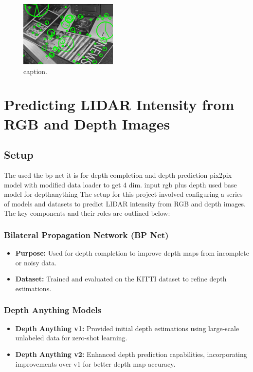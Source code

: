\begin{figure}[!ht]
	\centering
	\includegraphics[width=0.9\linewidth]{image.jpg}
	\caption{caption.}
	\label{img:example}
\end{figure}
\chapter{Predicting LIDAR Intensity from RGB and Depth Images}
\section{Setup}
The used the bp net it is for depth completion and depth prediction
pix2pix model with modified data loader to get 4 dim. input rgb plus depth
used base model for depthanything
The setup for this project involved configuring a series of models and datasets to predict LIDAR intensity from RGB and depth images. The key components and their roles are outlined below:

\subsection{Bilateral Propagation Network (BP Net)}
\begin{itemize}
	\item \textbf{Purpose:} Used for depth completion to improve depth maps from incomplete or noisy data.
	\item \textbf{Dataset:} Trained and evaluated on the KITTI dataset to refine depth estimations.
\end{itemize}

\subsection{Depth Anything Models}
\begin{itemize}
	\item \textbf{Depth Anything v1:} Provided initial depth estimations using large-scale unlabeled data for zero-shot learning.
	\item \textbf{Depth Anything v2:} Enhanced depth prediction capabilities, incorporating improvements over v1 for better depth map accuracy.
\end{itemize}

